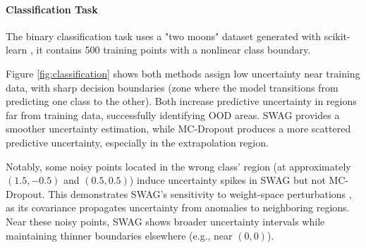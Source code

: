 \FloatBarrier

\newpage
\paragraph{Classification Task}
The binary classification task uses a "two moons" dataset generated with scikit-learn \citep{scikit-learn}, it contains 500 training points with a nonlinear class boundary.

\vspace{0.15cm}
Figure \ref{fig:classification} shows both methods assign low uncertainty near training data, with sharp
decision boundaries (zone where the model transitions from predicting one class to the other). Both
increase predictive uncertainty in regions far from training data, successfully identifying OOD areas.
SWAG provides a smoother uncertainty estimation, while MC-Dropout produces a more scattered predictive
uncertainty, especially in the extrapolation region. 

Notably, some noisy points located in the wrong class' region (at approximately $(1.5, -0.5)$ and
$(0.5, 0.5)$) induce uncertainty spikes in SWAG but not MC-Dropout. This demonstrates SWAG's sensitivity
to weight-space perturbations \citep{izmailov2019swa}, as its covariance propagates uncertainty from
anomalies to neighboring regions. Near these noisy points, SWAG shows broader uncertainty intervals
while maintaining thinner boundaries elsewhere (e.g., near $(0,0)$).

\FloatBarrier

